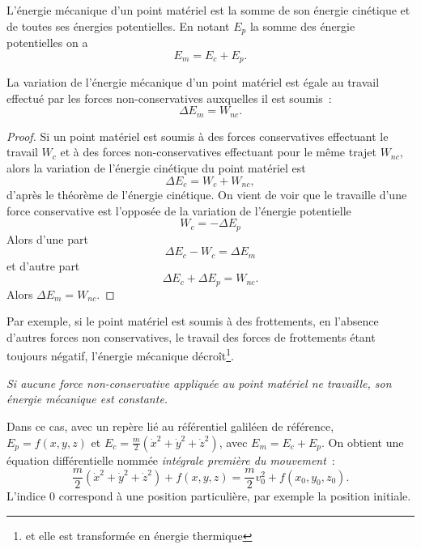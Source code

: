 \begin{defdef}
L'énergie mécanique d'un point matériel est la somme de son énergie cinétique et de toutes ses énergies potentielles. En notant $E_p$ la somme des énergie potentielles on a
\begin{equation}
E_m = E_c + E_p.
\end{equation}
\end{defdef}

\begin{theo}
  La variation de l'énergie mécanique d'un point matériel est égale au travail effectué par les forces non-conservatives auxquelles il est soumis~:
  \begin{equation}
    \Delta E_m = W_{nc}.
  \end{equation}
\end{theo}
\begin{proof}
 Si un point matériel est soumis à des forces conservatives effectuant le travail $W_c$ et à des forces non-conservatives effectuant pour le même trajet $W_{nc}$, alors la variation de l'énergie cinétique du point matériel est 
 \begin{equation}
   \Delta E_c = W_c +W_{nc},
 \end{equation}
d'après le théorème de l'énergie cinétique. On vient de voir que le travaille d'une force conservative est l'opposée de la variation de l'énergie potentielle
\begin{equation}
  W_c = - \Delta E_p
\end{equation}
Alors d'une part
\begin{equation}
  \Delta E_c -W_c = \Delta E_m
\end{equation}
et d'autre part
\begin{equation}
  \Delta E_c + \Delta E_p = W_{nc}.
\end{equation}
Alors $\Delta E_m = W_{nc}$.
\end{proof}

Par exemple, si le point matériel est soumis à des frottements, en l'absence d'autres forces non conservatives, le travail des forces de frottements étant toujours négatif, l'énergie mécanique décroît\footnote{et elle est transformée en énergie thermique}.

\emph{Si aucune force non-conservative appliquée au point matériel ne travaille, son énergie mécanique est constante.}

Dans ce cas, avec un repère lié au référentiel galiléen de référence, $E_p=f(x,y,z)$ et $E_c = \frac{m}{2}(\dot{x}^2+\dot{y}^2+\dot{z}^2)$, avec $E_m=E_c+E_p$. On obtient une équation différentielle nommée \emph{intégrale première du mouvement}~:
\begin{equation}
  \frac{m}{2}(\dot{x}^2+\dot{y}^2+\dot{z}^2) + f(x,y,z) = \frac{m}{2}v_0^2+f(x_0,y_0,z_0).
\end{equation}
L'indice $0$ correspond à une position particulière, par exemple la position initiale.

